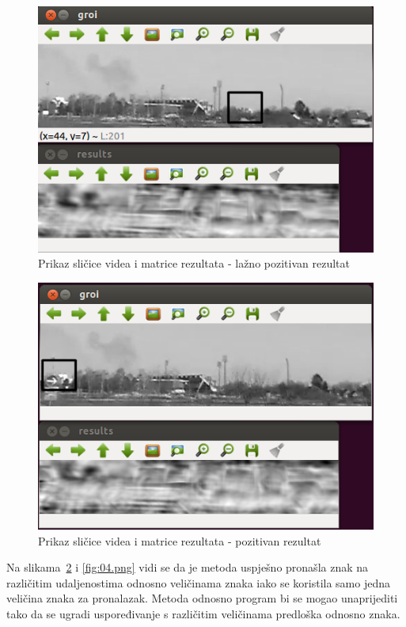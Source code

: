 \begin{figure}[h]
\centering
\includegraphics[scale=0.5]{figures/02.png}
\caption{Prikaz sličice videa i matrice rezultata - lažno pozitivan
rezultat}
\label{fig:02}
\end{figure}

\newpage
\begin{figure}[h]
\centering
\includegraphics[scale=0.5]{figures/03.png}
\caption{Prikaz sličice videa i matrice rezultata - pozitivan rezultat }
\label{fig:03.png}
\end{figure}

Na slikama~\ref{fig:03.png} i \ref{fig:04.png}  vidi se
da je metoda uspješno pronašla znak na različitim udaljenostima odnosno
veličinama znaka iako se koristila samo jedna veličina znaka za
pronalazak. Metoda odnosno program bi se mogao unaprijediti tako da se
ugradi uspoređivanje s različitim veličinama predloška odnosno znaka.

